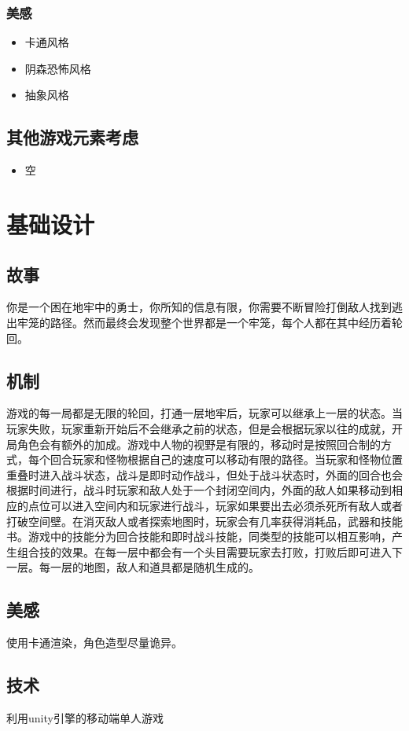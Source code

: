 \documentclass{article}
\begin{document}
\subsubsection{美感}
\begin{itemize}
	\item 卡通风格
	\item 阴森恐怖风格
	\item 抽象风格
\end{itemize}
\subsection{其他游戏元素考虑}
\begin{itemize}
	\item 空
\end{itemize}

\section{基础设计}
\subsection{故事}
你是一个困在地牢中的勇士，你所知的信息有限，你需要不断冒险打倒敌人找到逃出牢笼的路径。然而最终会发现整个世界都是一个牢笼，每个人都在其中经历着轮回。
\subsection{机制}
游戏的每一局都是无限的轮回，打通一层地牢后，玩家可以继承上一层的状态。当玩家失败，玩家重新开始后不会继承之前的状态，但是会根据玩家以往的成就，开局角色会有额外的加成。游戏中人物的视野是有限的，移动时是按照回合制的方式，每个回合玩家和怪物根据自己的速度可以移动有限的路径。当玩家和怪物位置重叠时进入战斗状态，战斗是即时动作战斗，但处于战斗状态时，外面的回合也会根据时间进行，战斗时玩家和敌人处于一个封闭空间内，外面的敌人如果移动到相应的点位可以进入空间内和玩家进行战斗，玩家如果要出去必须杀死所有敌人或者打破空间壁。在消灭敌人或者探索地图时，玩家会有几率获得消耗品，武器和技能书。游戏中的技能分为回合技能和即时战斗技能，同类型的技能可以相互影响，产生组合技的效果。在每一层中都会有一个头目需要玩家去打败，打败后即可进入下一层。每一层的地图，敌人和道具都是随机生成的。
\subsection{美感}
使用卡通渲染，角色造型尽量诡异。
\subsection{技术}
利用unity引擎的移动端单人游戏
\end{document}

